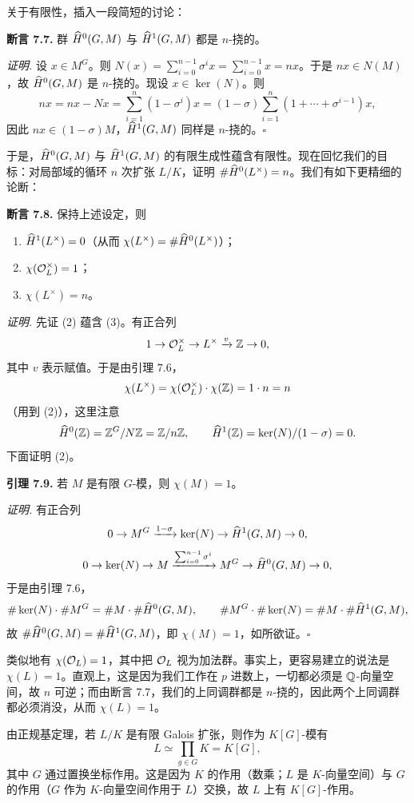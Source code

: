 关于有限性，插入一段简短的讨论：

\textbf{断言 7.7.} 群 $\widehat{H}^0(G,M)$ 与 $\widehat{H}^1(G,M)$ 都是 $n$-挠的。

\textit{证明.} 设 $x\in M^G$。则 $N(x)=\sum_{i=0}^{n-1}\sigma^i x=\sum_{i=0}^{n-1}x=nx$。于是 $nx\in N(M)$，故 $\widehat{H}^0(G,M)$ 是 $n$-挠的。现设 $x\in\ker(N)$。则
\[
nx=nx-Nx=\sum_{i=1}^{n}(1-\sigma^i)x=(1-\sigma)\sum_{i=1}^{n}(1+\cdots+\sigma^{i-1})x,
\]
因此 $nx\in(1-\sigma)M$，$\widehat{H}^1(G,M)$ 同样是 $n$-挠的。\hfill$\square$

于是，$\widehat{H}^0(G,M)$ 与 $\widehat{H}^1(G,M)$ 的有限生成性蕴含有限性。现在回忆我们的目标：对局部域的循环 $n$ 次扩张 $L/K$，证明 $\#\widehat{H}^0(L^\times)=n$。我们有如下更精细的论断：

\textbf{断言 7.8.} 保持上述设定，则
\begin{enumerate}
\item[(1)] $\widehat{H}^1(L^\times)=0$（从而 $\chi(L^\times)=\#\widehat{H}^0(L^\times)$）；
\item[(2)] $\chi(\mathcal{O}_L^\times)=1$；
\item[(3)] $\chi(L^\times)=n$。
\end{enumerate}

\textit{证明.} 先证 (2) 蕴含 (3)。有正合列
\[
1\to\mathcal{O}_L^\times\to L^\times\xrightarrow{v}\mathbb{Z}\to 0,
\]
其中 $v$ 表示赋值。于是由引理 7.6，
\[
\chi(L^\times)=\chi(\mathcal{O}_L^\times)\cdot\chi(\mathbb{Z})=1\cdot n=n
\]
（用到 (2)），这里注意
\[
\widehat{H}^0(\mathbb{Z})=\mathbb{Z}^G/N\mathbb{Z}=\mathbb{Z}/n\mathbb{Z},\qquad
\widehat{H}^1(\mathbb{Z})=\ker(N)/(1-\sigma)=0 .
\]
下面证明 (2)。

\textbf{引理 7.9.} 若 $M$ 是有限 $G$-模，则 $\chi(M)=1$。

\textit{证明.} 有正合列
\[
0\to M^G\xrightarrow{1-\sigma}\ker(N)\to\widehat{H}^1(G,M)\to 0,
\]
\[
0\to\ker(N)\to M\xrightarrow{\sum_{i=0}^{n-1}\sigma^i}M^G\to\widehat{H}^0(G,M)\to 0,
\]
于是由引理 7.6，
\[
\#\ker(N)\cdot\#M^G=\#M\cdot\#\widehat{H}^0(G,M),\qquad
\#M^G\cdot\#\ker(N)=\#M\cdot\#\widehat{H}^1(G,M),
\]
故 $\#\widehat{H}^0(G,M)=\#\widehat{H}^1(G,M)$，即 $\chi(M)=1$，如所欲证。\hfill$\square$

类似地有 $\chi(\mathcal{O}_L)=1$，其中把 $\mathcal{O}_L$ 视为加法群。事实上，更容易建立的说法是 $\chi(L)=1$。直观上，这是因为我们工作在 $p$ 进数上，一切都必须是 $\mathbb{Q}$-向量空间，故 $n$ 可逆；而由断言 7.7，我们的上同调群都是 $n$-挠的，因此两个上同调群都必须消没，从而 $\chi(L)=1$。

由正规基定理，若 $L/K$ 是有限 Galois 扩张，则作为 $K[G]$-模有
\[
L\simeq\prod_{g\in G}K=K[G],
\]
其中 $G$ 通过置换坐标作用。这是因为 $K$ 的作用（数乘；$L$ 是 $K$-向量空间）与 $G$ 的作用（$G$ 作为 $K$-向量空间作用于 $L$）交换，故 $L$ 上有 $K[G]$-作用。

